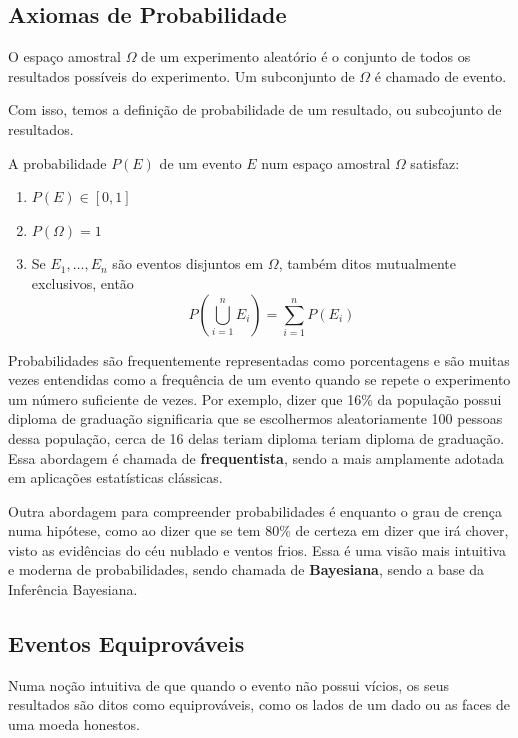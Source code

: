 \subsection{Axiomas de Probabilidade}
\begin{def:espaco amostral}
O espaço amostral $\Omega$ de um experimento aleatório é o conjunto de todos os resultados
possíveis do experimento. Um subconjunto de $\Omega$ é chamado de evento.
\end{def:espaco amostral}
Com isso, temos a definição de probabilidade de um resultado, ou subcojunto de resultados.
\begin{def:probabilidade}
A probabilidade $P(E)$ de um evento $E$ num espaço amostral $\Omega$ satisfaz:
\begin{enumerate}
	\item $P(E) \in [0, 1]$

	\item $P(\Omega) = 1$

	\item Se $E_1, \ldots, E_n$ são eventos disjuntos em $\Omega$, também ditos mutualmente
	      exclusivos, então
	      \[
		      P\left(\bigcup_{i=1}^n E_i\right) = \sum_{i=1}^n P(E_i)
	      \]
\end{enumerate}
\end{def:probabilidade}
Probabilidades são frequentemente representadas como porcentagens e são muitas vezes
entendidas como a frequência de um evento quando se repete o experimento um número
suficiente de vezes. Por exemplo, dizer que 16\% da população possui diploma de
graduação significaria que se escolhermos aleatoriamente 100 pessoas dessa população,
cerca de 16 delas teriam diploma teriam diploma de graduação. Essa abordagem é chamada
de \textbf{frequentista}, sendo a mais amplamente adotada em aplicações estatísticas
clássicas.

Outra abordagem para compreender probabilidades é enquanto o grau de crença numa hipótese,
como ao dizer que se tem 80\% de certeza em dizer que irá chover, visto as evidências do
céu nublado e ventos frios. Essa é uma visão mais intuitiva e moderna de probabilidades,
sendo chamada de \textbf{Bayesiana}, sendo a base da Inferência Bayesiana.

\subsection{Eventos Equiprováveis}
Numa noção intuitiva de que quando o evento não possui vícios, os seus resultados
são ditos como equiprováveis, como os lados de um dado ou as faces de uma moeda honestos.


